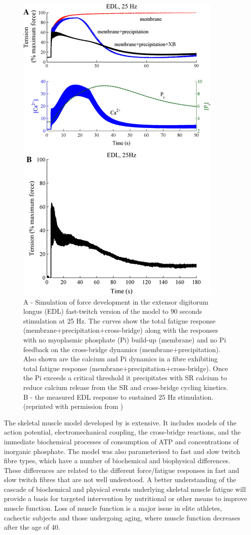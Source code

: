 \documentclass[fleqn,10pt]{physiome}
\begin{document}
\begin{figure}[ht!]
\centering
\includegraphics[width=0.5\linewidth]{fig01}
\caption{A - Simulation of force development in the extensor digitorum longus (EDL) fast-twitch version of the model to 90 seconds stimulation at 25 Hz. The curves show the total fatigue response (membrane+precipitation+cross-bridge) along with the responses with no myoplasmic phosphate (Pi) build-up (membrane) and no Pi feedback on the cross-bridge dynamics (membrane+precipitation). Also shown are the calcium and Pi dynamics in a fibre exhibiting total fatigue response (membrane+precipitation+cross-bridge). Once the Pi exceeds a critical threshold it precipitates with SR calcium to reduce calcium release from the SR and cross-bridge cycling kinetics. 
B - the measured EDL response to sustained 25 Hz stimulation. 
(reprinted with permission from \citet{shorten2007mathematical})
}
\label{fig01}
\end{figure}

The skeletal muscle model developed by \citet{shorten2007mathematical} is extensive. It includes models of the action potential, electromechanical coupling, the cross-bridge reactions, and the immediate biochemical processes of consumption of ATP and concentrations of inorganic phosphate. The model was also parameterised to fast and slow twitch fibre types, which have a number of biochemical and biophysical differences. These differences are related to the different force/fatigue responses in fast and slow twitch fibres that are not well understood. A better understanding of the cascade of biochemical and physical events underlying skeletal muscle fatigue will provide a basis for targeted intervention by nutritional or other means to improve muscle function. Loss of muscle function is a major issue in elite athletes, cachectic subjects and those undergoing aging, where muscle function decreases after the age of 40.
\end{document}
